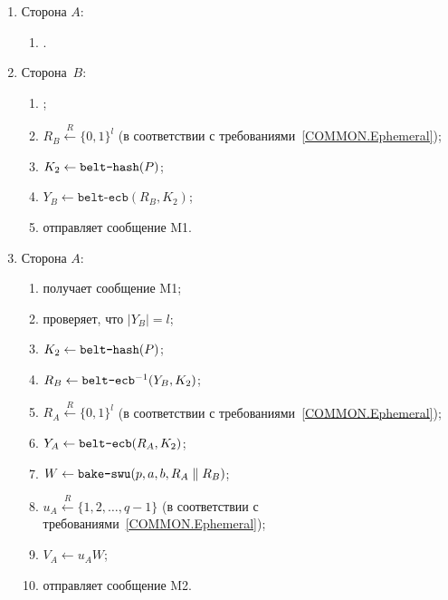 \begin{enumerate}
\item
Сторона $A$:
\begin{enumerate}
\item
{}.
\end{enumerate}

\item
Сторона~$B$:
\begin{enumerate}
\item
{};
\item
$R_B\stackrel{R}{\leftarrow}\{0,1\}^{l}$ 
(в соответствии с требованиями~\ref{COMMON.Ephemeral});
\item
$K_2\leftarrow\texttt{belt-hash}(P)$;
\item
$Y_B\leftarrow \texttt{belt-ecb}(R_B,K_2)$;
\item
отправляет сообщение M1.
\end{enumerate}

\item
Сторона $A$:
\begin{enumerate}
\item
получает сообщение M1;
\item
проверяет, что $|Y_B|=l$;
\item
$K_2\leftarrow\texttt{belt-hash}(P)$;
\item
$R_B\leftarrow \texttt{belt-ecb}^{-1}(Y_B,K_2)$;
\item
$R_A\stackrel{R}{\leftarrow}\{0,1\}^{l}$
(в соответствии с требованиями~\ref{COMMON.Ephemeral});
\item
$Y_A\leftarrow\texttt{belt-ecb}(R_A,K_2)$;
\item
$W\leftarrow\texttt{bake-swu}(p,a,b,R_A\parallel R_B)$;
\item
$u_A\stackrel{R}{\leftarrow}\{1,2,\ldots,q-1\}$
(в соответствии с требованиями~\ref{COMMON.Ephemeral});
\item
$V_A\leftarrow u_A W$;
\item
отправляет сообщение M2.
\end{enumerate}


\end{enumerate}
